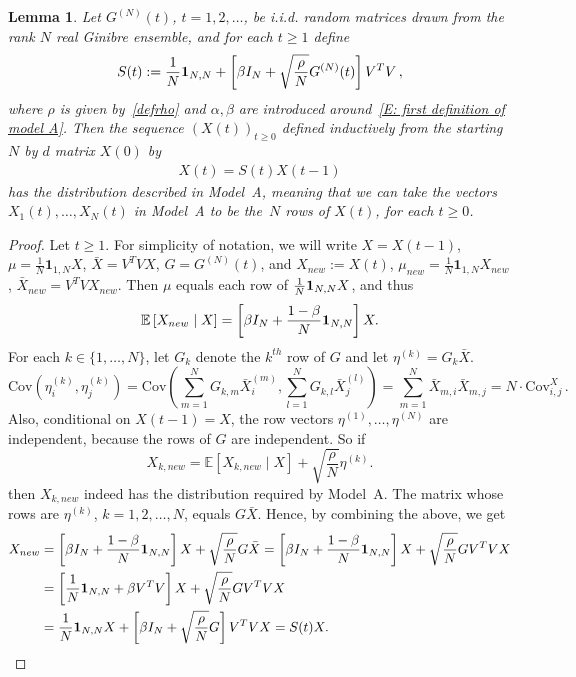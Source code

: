 \documentclass[12pt]{article}
\newtheorem{lemma}{Lemma}
\newcommand{\E}{\mathbb{E}}
\newcommand{\Cov}{\mathrm{Cov}}
\newcommand{\1}{\mathbf{1}}
\begin{document}
\begin{lemma}\label{LS: X and Xdash} Let $G^{(N)}(t)$, $t=1,2,\dots$, be i.i.d. random matrices drawn from the rank $N$ real Ginibre ensemble, and for each $t \ge 1$ define
$$
S(t) :=  \frac1N{\bf 1}_{N,N} +
\left[\beta I_N
+\sqrt{\frac{\rho}N} G^{(N)}(t)  \right]V^T V\,, 
$$
where $\rho$ is given by~\eqref{defrho} and $\alpha,\beta$ are introduced around~\eqref{E: first definition of model A}.
Then the sequence $\left(X(t)\right)_{t \ge 0}$  defined inductively from the starting $N$ by $d$ matrix $X(0)$ by
\begin{align} \label{XX1}
X(t)= S(t) X(t-1)
\end{align}
has the distribution described in Model~A, meaning that we can take the vectors $X_1(t), \dots, X_N(t)$ in Model~A to be the~$N$ rows of $X(t)$, for each $t \ge 0$. 
\end{lemma}
\begin{proof}  
Let $t \ge 1$. For simplicity of notation, we will write $X = X(t-1)$,  $\mu = \frac{1}{N}\mathbf{1}_{1,N} X$, $\bar{X} = V^T V X$, $G = G^{(N)}(t)$,  and $X_{new}:=X(t)$, $\mu_{new} = \frac{1}{N}\mathbf{1}_{1,N} X_{new}$, $\bar X_{new} = V^T V X_{new}$. Then $\mu$ equals each row of $\frac1N{\bf 1}_{N,N} X$, and thus
$$
\E \left[X_{new}\mid X\right]=\left[\beta I_N+\frac{1-\beta}N{\bf 1}_{N,N} \right]X.
$$
For each $k \in \{1, \dots, N\}$, let $G_k$ denote the $k^{th}$ row of $G$ and let $\eta^{(k)} = G_k \bar X$. 
$$
\Cov\left(\eta^{(k)}_i,\eta^{(k)}_j\right)=
\Cov\left(\sum_{m=1}^N  G_{k,m} \bar  X_i^{(m)} ,\sum_{l=1}^N  G_{k,l} \bar  X_j^{(l)}\right)=
\sum_{m=1}^N \bar  X_{m,i}\bar  X_{m,j} =N\cdot \Cov^X_{i,j}\,.
$$
Also, conditional on $X(t-1) = X$, the row vectors $\eta^{(1)}, \dots, \eta^{(N)}$ are independent, because the rows of $G$ are independent. So if
$$
X_{k,new}=\E \left[X_{k,new}\mid X\right]+\sqrt{\frac{\rho}N}\eta^{(k)}.
$$
then $X_{k,new}$ indeed has the distribution required by Model~A. The matrix whose rows are $\eta^{(k)}$, $k=1,2,\dots,N$, equals $G\bar X$. Hence, by combining the above, we get
\begin{align*} 
X_{new}&=\left[\beta I_N+\frac{1-\beta}N{\bf 1}_{N,N} \right]X
+\sqrt{\frac{\rho}N} G \bar X
=\left[\beta I_N+\frac{1-\beta}N{\bf 1}_{N,N} \right]X
+\sqrt{\frac{\rho}N} G V^T V X
\\ 
&=\left[\frac1N{\bf 1}_{N,N} +
\beta V^T V\right]X
+\sqrt{\frac{\rho}N} G V^T V X
\\ &
=\frac1N{\bf 1}_{N,N} X+
\left[\beta I_N
+\sqrt{\frac{\rho}N} G  \right]V^T V X
= S(t) X.
\end{align*}
\end{proof}
\end{document}
